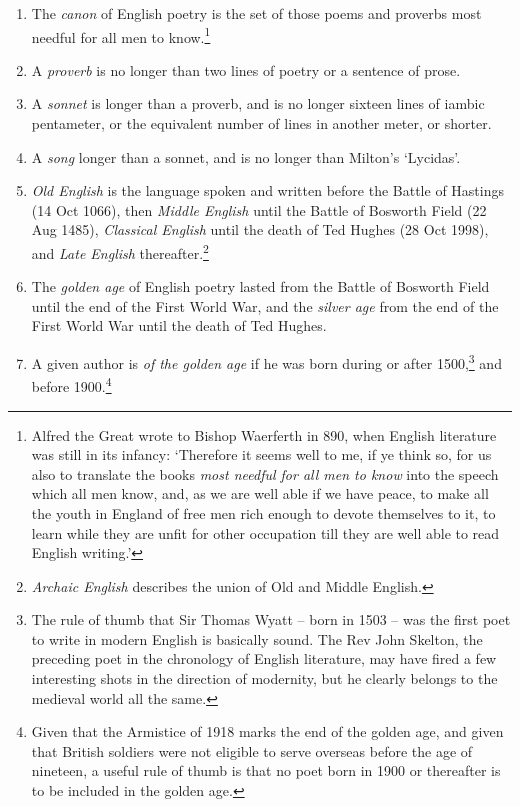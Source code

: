 \begin{enumerate}[resume]
    \item{The \emph{canon} of English poetry is the set of those poems and proverbs most needful for all men to know.\footnote{Alfred the Great wrote to Bishop Waerferth in 890, when English literature was still in its infancy: `Therefore it seems well to me, if ye think so, for us also to translate the books \emph{most needful for all men to know} into the speech which all men know, and, as we are well able if we have peace, to make all the youth in England of free men rich enough to devote themselves to it, to learn while they are unfit for other occupation till they are well able to read English writing.'}}
    \item{A \emph{proverb} is no longer than two lines of poetry or a sentence of prose.}
    \item{A \emph{sonnet} is longer than a proverb, and is no longer sixteen lines of iambic pentameter, or the equivalent number of lines in another meter, or shorter.}
    \item{A \emph{song} longer than a sonnet, and is no longer than Milton's `Lycidas'.}
    \item{\textit{Old English} is the language spoken and written before the Battle of Hastings (14 Oct 1066), then \emph{Middle English} until the Battle of Bosworth Field (22 Aug 1485), \emph{Classical English} until the death of Ted Hughes (28 Oct 1998), and \emph{Late English} thereafter.\footnote{\emph{Archaic English} describes the union of Old and Middle English.}}
    \item{The \emph{golden age} of English poetry lasted from the Battle of Bosworth Field until the end of the First World War, and the \emph{silver age} from the end of the First World War until the death of Ted Hughes.}
    \item{A given author is \emph{of the golden age} if he was born during or after 1500,\footnote{The rule of thumb that Sir Thomas Wyatt -- born in 1503 -- was the first poet to write in modern English is basically sound. The Rev John Skelton, the preceding poet in the chronology of English literature, may have fired a few interesting shots in the direction of modernity, but he clearly belongs to the medieval world all the same.} and before 1900.\footnote{Given that the Armistice of 1918 marks the end of the golden age, and given that British soldiers were not eligible to serve overseas before the age of nineteen, a useful rule of thumb is that no poet born in 1900 or thereafter is to be included in the golden age.}}

\end{enumerate}
